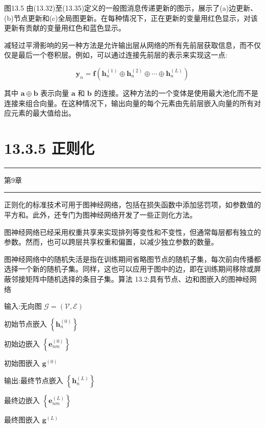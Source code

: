 \documentclass[10pt]{report}
\newcommand{\HRule}{\begin{center}\rule{0.9\linewidth}{0.2mm}\end{center}}
\begin{document}
图13.5 由(13.32)至(13.35)定义的一般图消息传递更新的图示，展示了(a)边更新、(b)节点更新和(c)全局图更新。在每种情况下，正在更新的变量用红色显示，对该更新有贡献的变量用红色和蓝色显示。

减轻过平滑影响的另一种方法是允许输出层从网络的所有先前层获取信息，而不仅仅是最后一个卷积层。例如，可以通过连接先前层的表示来实现这一点:

\[
{\mathbf{y}}_{n} = \mathbf{f}\left( {{\mathbf{h}}_{n}^{\left( 1\right) } \oplus  {\mathbf{h}}_{n}^{\left( 2\right) } \oplus  \cdots  \oplus  {\mathbf{h}}_{n}^{\left( L\right) }}\right)  \tag{13.37}
\]

其中 \(\mathbf{a} \oplus  \mathbf{b}\) 表示向量 \(\mathbf{a}\) 和 \(\mathbf{b}\) 的连接。这种方法的一个变体是使用最大池化而不是连接来组合向量。在这种情况下，输出向量的每个元素由先前层嵌入向量的所有对应元素的最大值给出。

\section*{13.3.5 正则化}

\HRule

第9章

\HRule

正则化的标准技术可用于图神经网络，包括在损失函数中添加惩罚项，如参数值的平方和。此外，还专门为图神经网络开发了一些正则化方法。

图神经网络已经采用权重共享来实现排列等变性和不变性，但通常每层都有独立的参数。然而，也可以跨层共享权重和偏置，以减少独立参数的数量。

图神经网络中的随机失活是指在训练期间省略图节点的随机子集，每次前向传播都选择一个新的随机子集。同样，这也可以应用于图中的边，即在训练期间移除或屏蔽邻接矩阵中随机选择的条目子集。算法 13.2:具有节点、边和图嵌入的图神经网络

输入:无向图 \(\mathcal{G} = \left( {\mathcal{V},\mathcal{E}}\right)\)

初始节点嵌入 \(\left\{  {\mathbf{h}}_{n}^{\left( 0\right) }\right\}\)

初始边嵌入 \(\left\{  {\mathbf{e}}_{nm}^{\left( 0\right) }\right\}\)

初始图嵌入 \({\mathbf{g}}^{\left( 0\right) }\)

输出:最终节点嵌入 \(\left\{  {\mathbf{h}}_{n}^{\left( L\right) }\right\}\)

最终边嵌入 \(\left\{  {\mathbf{e}}_{nm}^{\left( L\right) }\right\}\)

最终图嵌入 \({\mathbf{g}}^{\left( L\right) }\)
\end{document}
